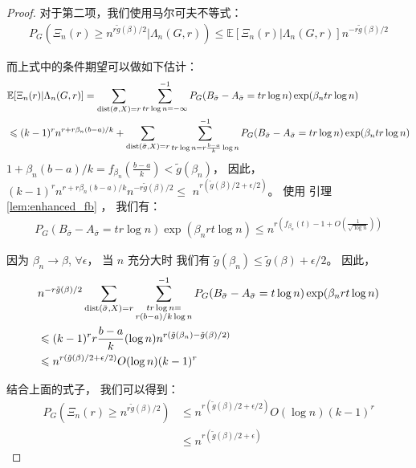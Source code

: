 \begin{proof}
  对于第二项，我们使用马尔可夫不等式：
  \begin{align*}
  P_G(\Xi_n(r) \geq n^{r \tilde{g}(\beta) /2} |\Lambda_n(G,r) )
  \leq \mathbb{E}[\Xi_n(r)|\Lambda_n(G,r)]n^{-r \tilde{g}(\beta) /2} 
  \end{align*}
  
  而上式中的条件期望可以做如下估计：
  \begin{align*}
  &\mathbb{E}[\Xi_n(r)|\Lambda_n(G,r)]=
  \sum_{\operatorname{dist}(\bar{\sigma}, X) = r}\sum_{tr\log n = -\infty }^{-1} 
   P_G(B_{\bar{\sigma}} -A_{\bar{\sigma}}=tr\log n)\exp(\beta_n tr \log n) \\
  & \leqslant (k-1)^r n^{r+r\beta_n(b-a)/k} +
  \sum_{\operatorname{dist}(\bar{\sigma}, X) = r}\sum_{tr\log n = r\frac{b-a}{k}\log n }^{-1} 
   P_G(B_{\bar{\sigma}} -A_{\bar{\sigma}}=tr\log n)\exp(\beta_n tr \log n)
  \end{align*}
  $1+\beta_n(b-a)/k = f_{\beta_n}(\frac{b-a}{k}) < \tilde{g}(\beta_n)$，
  因此，
  $(k-1)^r n^{r+r\beta_n (b-a)/k}n^{-r \tilde{g}(\beta) /2} \leq$
   $n^{r (\tilde{g}(\beta) /2 + \epsilon/2)} $。
  使用 引理 \ref{lem:enhanced_fb} ， 我们有：
  \begin{align*}
  P_G(B_{\bar{\sigma}} -A_{\bar{\sigma}}=tr\log n)\exp(\beta_n rt \log n) \leq 
  n^{r(f_{\beta_n}(t)-1 + O(\frac{1}{\sqrt{\log n}}))}
  \end{align*}
  
  因为 $\beta_n \to \beta$, $\forall \epsilon$，
  当 $n$ 充分大时
  我们有 $\tilde{g}(\beta_n) \leq \tilde{g}(\beta) + \epsilon /2$。
  因此，
  \begin{align*}
  &n^{-r \tilde{g}(\beta) /2}\sum_{\operatorname{dist}(\bar{\sigma}, X) = r}\sum_{\substack{tr\log n = \\ r(b-a)/k\log n} }^{-1}
  P_G(B_{\bar{\sigma}} -A_{\bar{\sigma}}=t\log n)\exp(\beta_n rt \log n) \\
  & \leqslant  (k-1)^r r\frac{b-a}{k} ( \log n )
  n^{r(\tilde{g}(\beta_n) - \tilde{g}(\beta)/2)}\\
  & \leqslant  n^{r(\tilde{g}(\beta)/2 + \epsilon/2)} O(\log n) (k-1)^r
  \end{align*}
  
  结合上面的式子， 我们可以得到：
  \begin{align*}
  P_{G}(\Xi_n(r) \geq n^{r \tilde{g}(\beta) /2}) &\leq  n^{r(\tilde{g}(\beta)/2 + \epsilon/2)} O(\log n) (k-1)^r\\
  &\leq n^{r(\tilde{g}(\beta)/2 + \epsilon)}
  \end{align*}
  

\end{proof}
